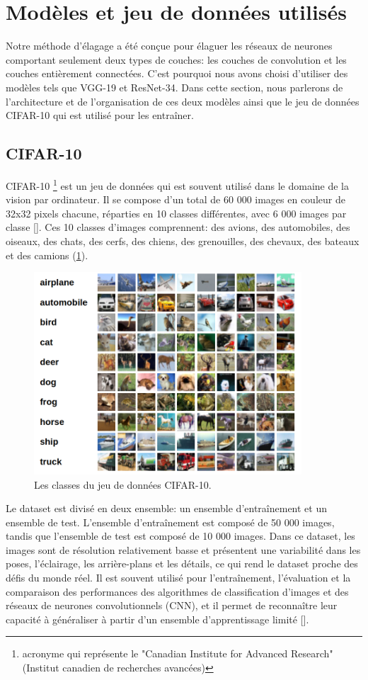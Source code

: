 \section{Modèles et jeu de données utilisés}
Notre méthode d'élagage a été conçue pour élaguer les réseaux de neurones comportant seulement deux types de couches: les couches de convolution et les couches entièrement connectées. C'est pourquoi nous avons choisi d'utiliser des modèles tels que VGG-19 et ResNet-34. Dans cette section, nous parlerons de l'architecture et de l'organisation de ces deux modèles ainsi que le jeu de données CIFAR-10 qui est utilisé pour les entraîner.
\subsection{CIFAR-10}
CIFAR-10 \footnote{acronyme qui représente le "Canadian Institute for Advanced Research" (Institut canadien de recherches avancées)} est un jeu de données qui est souvent utilisé dans le domaine de la vision par ordinateur. Il se compose d'un total de 60 000 images en couleur de 32x32 pixels chacune, réparties en 10 classes différentes, avec 6 000 images par classe [\cite{krizhevsky2009learning}]. Ces 10 classes d'images comprennent: des avions, des automobiles, des oiseaux, des chats, des cerfs, des chiens, des grenouilles, des chevaux, des bateaux et des camions (\ref{fig:cifar-10-classes}).

\begin{figure}[hbt!]
  \centering
  \includegraphics[width=10cm]{images_pfe/cifar-10-classes.png}
  \caption{Les classes du jeu de données CIFAR-10.}
  \label{fig:cifar-10-classes}
\end{figure}
\FloatBarrier
\medskip

Le dataset est divisé en deux ensemble: un ensemble d'entraînement et un ensemble de test. L'ensemble d'entraînement est composé de 50 000 images, tandis que l'ensemble de test est composé de 10 000 images. Dans ce dataset, les images sont de résolution relativement basse et présentent une variabilité dans les poses, l'éclairage, les arrière-plans et les détails, ce qui rend le dataset proche des défis du monde réel. Il est souvent utilisé pour l'entraînement, l'évaluation et la comparaison des performances des algorithmes de classification d'images et des réseaux de neurones convolutionnels (CNN), et il permet de reconnaître leur capacité à généraliser à partir d'un ensemble d'apprentissage limité [\cite{krizhevsky2009learning}].

